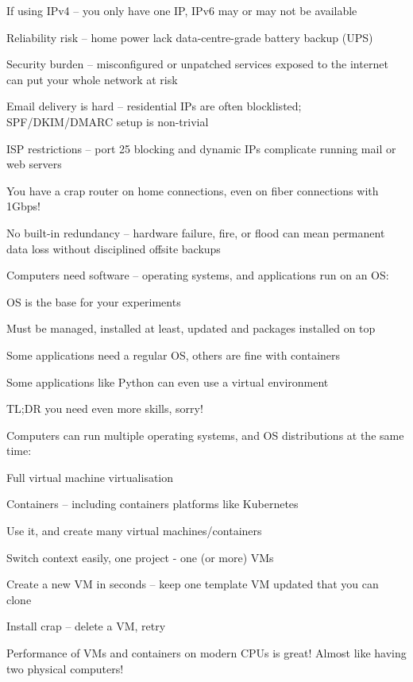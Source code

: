 \documentclass[Screen16to9,17pt]{foils}
\begin{document}

\begin{list2}
\item If using IPv4 -- you only have one IP, IPv6 may or may not be available
\item Reliability risk -- home power lack data-centre-grade battery backup (UPS)
\item Security burden -- misconfigured or unpatched services exposed to the internet can put your whole network at risk
\item Email delivery is hard -- residential IPs are often blocklisted; SPF/DKIM/DMARC setup is non-trivial
\item ISP restrictions -- port 25 blocking and dynamic IPs complicate running mail or web servers
\item You have a crap router on home connections, even on fiber connections with 1Gbps!
\item No built-in redundancy -- hardware failure, fire, or flood can mean permanent data loss without disciplined offsite backups
\end{list2}



Computers need software -- operating systems, and applications run on an OS:
\begin{list2}
\item OS is the base for your experiments
\item Must be managed, installed at least, updated and packages installed on top
\item Some applications need a regular OS, others are fine with containers
\item Some applications like Python can even use a virtual environment
\end{list2}

TL;DR you need even more skills, sorry!



Computers can run multiple operating systems, and OS distributions at the same time:
\begin{list2}
\item Full virtual machine virtualisation
\item Containers -- including containers platforms like Kubernetes
\item Use it, and create many virtual machines/containers
\item Switch context easily, one project - one (or more) VMs
\item Create a new VM in seconds -- keep one template VM updated that you can clone
\item Install crap -- delete a VM, retry
\item Performance of VMs and containers on modern CPUs is great! Almost like having two physical computers!
\end{list2}
\end{document}
